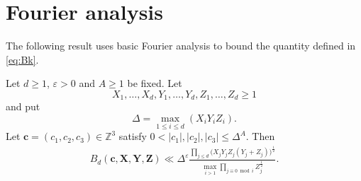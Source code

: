 \section{Fourier analysis}\label{s:fourier}

The following result uses basic Fourier analysis to bound the
quantity
defined in \eqref{eq:Bk}.

\begin{proposition}\label{prop:boundingsolutions}
Let $d\geq 1$, $\varepsilon>0$ and $A\geq 1$ be fixed.
Let $$
X_1,\ldots, X_d, Y_1,\ldots, Y_d,Z_1,\ldots, Z_d\geq 1
$$
and put
\begin{equation}\label{eq:Delta}
\Delta =\max_{1\leq i\leq d}(X_iY_iZ_i).
\end{equation}
Let  $\mathbf{c}=(c_1,c_2,c_3)\in \mathbb{Z}^3$ satisfy $0<|c_1|,|c_2|,|c_3|\leq \Delta^A$.
Then
\begin{align*}
B_d(\mathbf{c},\mathbf{X},\mathbf{Y},\mathbf{Z})   \ll
\Delta^\varepsilon \frac{\prod_{j\leq d} \big(X_jY_jZ_j(Y_j+Z_j)\big)^{\frac{1}{2}}}{\max_{i>1}\prod_{j\equiv 0\bmod i}Z_j^{\frac{1}{2}}}.
\end{align*}
\end{proposition}

